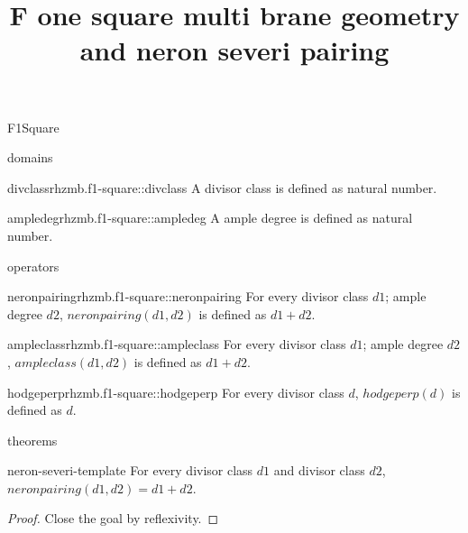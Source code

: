 \begin{lexlean}{F1Square}
\title{F one square multi brane geometry and neron severi pairing}

\begin{section}{domains}
  \begin{typedefinition}{divclass}{rhzmb.f1-square::divclass}
  \noaxioms
  A divisor class is defined as natural number.
  \end{typedefinition}

  \begin{typedefinition}{ampledeg}{rhzmb.f1-square::ampledeg}
  \noaxioms
  A ample degree is defined as natural number.
  \end{typedefinition}
\end{section}

\begin{section}{operators}
  \begin{termdefinition}{neronpairing}{rhzmb.f1-square::neronpairing}
  \noaxioms
  For every divisor class \(d1\); ample degree \(d2\), \(neronpairing(d1, d2)\) is defined as \(d1 + d2\).
  \end{termdefinition}

  \begin{termdefinition}{ampleclass}{rhzmb.f1-square::ampleclass}
  \noaxioms
  For every divisor class \(d1\); ample degree \(d2\), \(ampleclass(d1, d2)\) is defined as \(d1 + d2\).
  \end{termdefinition}

  \begin{termdefinition}{hodgeperp}{rhzmb.f1-square::hodgeperp}
  \noaxioms
  For every divisor class \(d\), \(hodgeperp(d)\) is defined as \(d\).
  \end{termdefinition}
\end{section}

\begin{section}{theorems}
  \begin{theorem}{neron-severi-template}
  \noaxioms
  For every divisor class \(d1\) and divisor class \(d2\), \(neronpairing(d1, d2) = d1 + d2\).
  \begin{proof}
  Close the goal by reflexivity.
  \end{proof}
  \end{theorem}


\end{section}
\end{lexlean}
